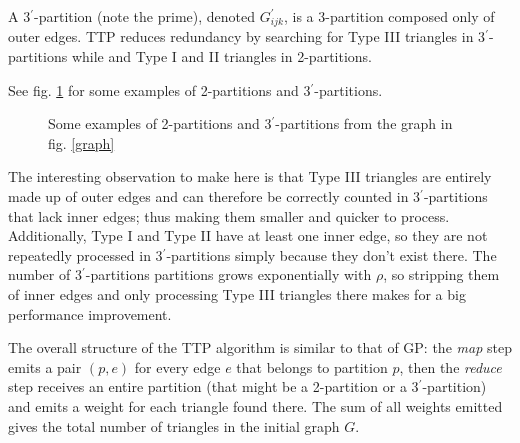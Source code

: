 \documentclass[paper=a4, fontsize=11pt]{scrartcl}
\begin{document}
A 3$^\prime$-partition (note the prime), denoted $G^{\prime}_{ijk}$, is a
3-partition composed only of outer edges. TTP reduces redundancy by searching
for Type III triangles in 3$^\prime$-partitions while and Type I and II
triangles in 2-partitions.

See fig. \ref{ttp} for some examples of 2-partitions and 3$^\prime$-partitions.

\begin{figure}[h]
    \centering

    \hspace{20pt}
    \hspace{20pt}

    \par\bigskip

    \hspace{20pt}
    \caption{Some examples of 2-partitions and 3$^\prime$-partitions from the
    graph in fig. \ref{graph}}
    \label{ttp}
\end{figure}

The interesting observation to make here is that Type III triangles are entirely
made up of outer edges and can therefore be correctly counted in
3$^\prime$-partitions that lack inner edges; thus making them smaller and
quicker to process. Additionally, Type I and Type II have at least one inner
edge, so they are not repeatedly processed in 3$^\prime$-partitions simply
because they don't exist there. The number of 3$^\prime$-partitions partitions
grows exponentially with $\rho$, so stripping them of inner edges and only
processing Type III triangles there makes for a big performance improvement.

The overall structure of the TTP algorithm is similar to that of GP: the
\emph{map} step emits a pair $(p, e)$ for every edge $e$ that belongs to
partition $p$, then the \emph{reduce} step receives an entire partition (that
might be a 2-partition or a 3$^\prime$-partition) and emits a weight for each
triangle found there. The sum of all weights emitted gives the total number of
triangles in the initial graph $G$.
\end{document}

